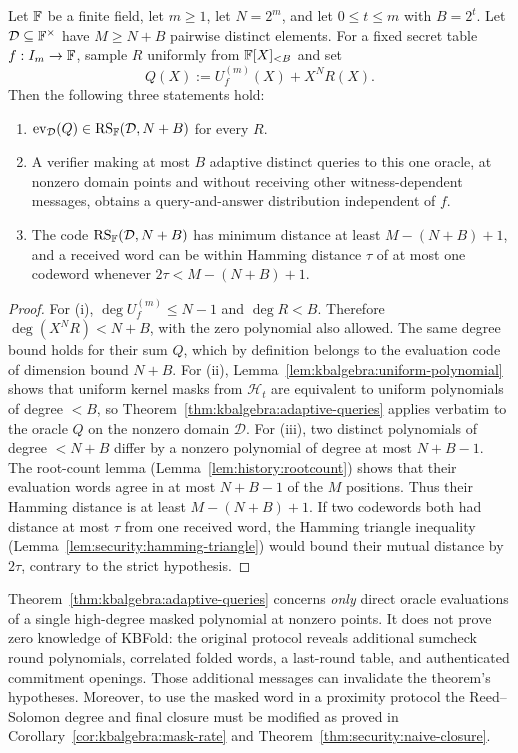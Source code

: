 \begin{theorem}\label{thm:kbalgebra:mask-rate-tradeoff}
Let $\mathbb{F}$ be a finite field, let $m\geq1$, let $N=2^m$, and let $0\leq t\leq m$ with $B=2^t$. Let $\mathcal D\subseteq\mathbb{F}^\times$ have $M\geq N+B$ pairwise distinct elements. For a fixed secret table $f:I_m\to\mathbb{F}$, sample $R$ uniformly from $\mathbb{F}[X]_{<B}$ and set
\[
 Q(X):=U_f^{(m)}(X)+X^N R(X).
\]
Then the following three statements hold:
\begin{enumerate}[label=\textup{(\roman*)}]
\item $\operatorname{ev}_{\mathcal D}(Q)\in\operatorname{RS}_{\mathbb{F}}(\mathcal D,N+B)$ for every $R$.
\item A verifier making at most $B$ adaptive distinct queries to this one oracle, at nonzero domain points and without receiving other witness-dependent messages, obtains a query-and-answer distribution independent of $f$.
\item The code $\operatorname{RS}_{\mathbb{F}}(\mathcal D,N+B)$ has minimum distance at least $M-(N+B)+1$, and a received word can be within Hamming distance $\tau$ of at most one codeword whenever $2\tau<M-(N+B)+1$.
\end{enumerate}
\end{theorem}
\begin{proof}
For (i), $\deg U_f^{(m)}\leq N-1$ and $\deg R<B$. Therefore $\deg(X^N R)<N+B$, with the zero polynomial also allowed. The same degree bound holds for their sum $Q$, which by definition belongs to the evaluation code of dimension bound $N+B$. For (ii), Lemma~\ref{lem:kbalgebra:uniform-polynomial} shows that uniform kernel masks from $\mathcal H_t$ are equivalent to uniform polynomials of degree $<B$, so Theorem~\ref{thm:kbalgebra:adaptive-queries} applies verbatim to the oracle $Q$ on the nonzero domain $\mathcal D$. For (iii), two distinct polynomials of degree $<N+B$ differ by a nonzero polynomial of degree at most $N+B-1$. The root-count lemma (Lemma~\ref{lem:history:rootcount}) shows that their evaluation words agree in at most $N+B-1$ of the $M$ positions. Thus their Hamming distance is at least $M-(N+B)+1$. If two codewords both had distance at most $\tau$ from one received word, the Hamming triangle inequality (Lemma~\ref{lem:security:hamming-triangle}) would bound their mutual distance by $2\tau$, contrary to the strict hypothesis.
\end{proof}

\begin{remark}\label{rem:kbalgebra:mask-scope}
Theorem~\ref{thm:kbalgebra:adaptive-queries} concerns \emph{only} direct oracle evaluations of a single high-degree masked polynomial at nonzero points. It does not prove zero knowledge of KBFold: the original protocol reveals additional sumcheck round polynomials, correlated folded words, a last-round table, and authenticated commitment openings. Those additional messages can invalidate the theorem's hypotheses. Moreover, to use the masked word in a proximity protocol the Reed--Solomon degree and final closure must be modified as proved in Corollary~\ref{cor:kbalgebra:mask-rate} and Theorem~\ref{thm:security:naive-closure}.
\end{remark}
